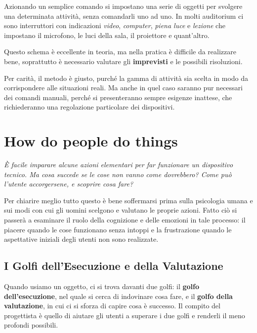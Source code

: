 \documentclass[a4paper,11pt,oneside]{book}
\begin{document}
Azionando un semplice comando si impostano una serie di oggetti per svolgere una determinata attività, senza comandarli uno ad uno. In molti auditorium ci sono interruttori con indicazioni \textit{video}, \textit{computer}, \textit{piena luce} e \textit{lezione} che impostano il microfono, le luci della sala, il proiettore e quant'altro.

Questo schema è eccellente in teoria, ma nella pratica è difficile da realizzare bene, soprattutto è necessario valutare gli \textbf{imprevisti} e le possibili risoluzioni.

Per carità, il metodo è giusto, purché la gamma di attività sia scelta in modo da corrispondere alle situazioni reali. Ma anche in quel caso saranno pur necessari dei comandi manuali, perché si presenteranno sempre esigenze inattese, che richiederanno una regolazione particolare dei dispositivi.


\chapter{How do people do things}
\begin{flushleft}
	\textit{
		È facile imparare alcune azioni elementari per far funzionare un dispositivo tecnico. Ma cosa succede se le cose non vanno come dovrebbero? Come può l'utente accorgersene, e scoprire cosa fare? }
\end{flushleft}

Per chiarire meglio tutto questo è bene soffermarsi prima sulla psicologia umana e sui modi con cui gli uomini scelgono e valutano le proprie azioni. Fatto ciò si passerà a esaminare il ruolo della cognizione e delle emozioni in tale processo: il piacere quando le cose funzionano senza intoppi e la frustrazione quando le aspettative iniziali degli utenti non sono realizzate.

\section{I Golfi dell'Esecuzione e della Valutazione}
Quando usiamo un oggetto, ci si trova davanti due golfi: il \textbf{golfo dell'esecuzione}, nel quale si cerca di indovinare cosa fare, e il \textbf{golfo della valutazione}, in cui ci si sforza di capire cosa è successo. Il compito del progettista è quello di aiutare gli utenti a superare i due golfi e renderli il meno profondi possibili.
\end{document}
